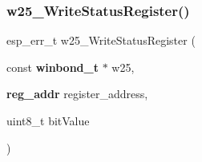 \mbox{\label{_w25_n01_g_v_8h_ac46e161fd2422285ae40bb6f52fb8d41}} 
\subsubsection{w25\+\_\+\+Write\+Status\+Register()}
{\footnotesize\ttfamily esp\+\_\+err\+\_\+t w25\+\_\+\+Write\+Status\+Register (\begin{DoxyParamCaption}\item[{const \textbf{ winbond\+\_\+t} $\ast$}]{w25,  }\item[{\textbf{ reg\+\_\+addr}}]{register\+\_\+address,  }\item[{uint8\+\_\+t}]{bit\+Value }\end{DoxyParamCaption})}

